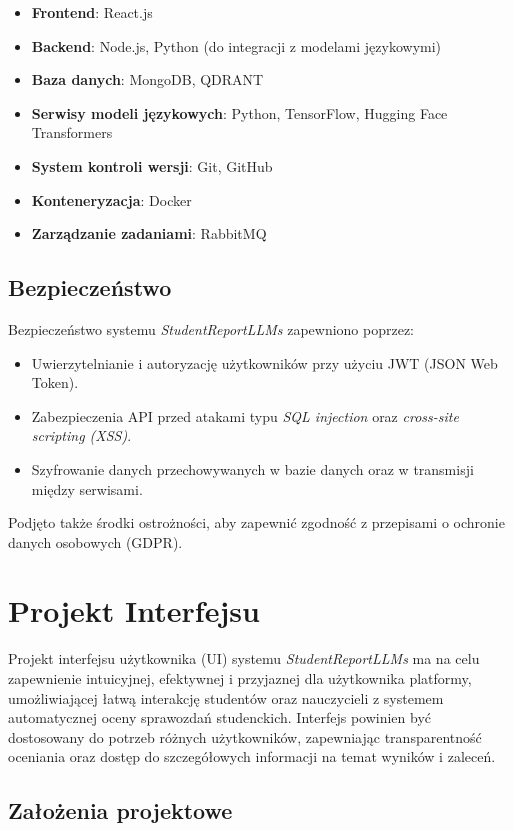 \documentclass[a4paper, 12pt]{article}
\begin{document}
\begin{itemize}
    \item \textbf{Frontend}: React.js
    \item \textbf{Backend}: Node.js, Python (do integracji z modelami językowymi)
    \item \textbf{Baza danych}: MongoDB, QDRANT
    \item \textbf{Serwisy modeli językowych}: Python, TensorFlow, Hugging Face Transformers
    \item \textbf{System kontroli wersji}: Git, GitHub
    \item \textbf{Konteneryzacja}: Docker
    \item \textbf{Zarządzanie zadaniami}: RabbitMQ
\end{itemize}

\subsection{Bezpieczeństwo}

Bezpieczeństwo systemu \textit{StudentReportLLMs} zapewniono poprzez:

\begin{itemize}
    \item Uwierzytelnianie i autoryzację użytkowników przy użyciu JWT (JSON Web Token).
    \item Zabezpieczenia API przed atakami typu \textit{SQL injection} oraz \textit{cross-site scripting (XSS)}.
    \item Szyfrowanie danych przechowywanych w bazie danych oraz w transmisji między serwisami.
\end{itemize}

Podjęto także środki ostrożności, aby zapewnić zgodność z przepisami o ochronie danych osobowych (GDPR).

\newpage
\section{Projekt Interfejsu}
Projekt interfejsu użytkownika (UI) systemu \textit{StudentReportLLMs} ma na celu zapewnienie intuicyjnej, efektywnej i przyjaznej dla użytkownika platformy, umożliwiającej łatwą interakcję studentów oraz nauczycieli z systemem automatycznej oceny sprawozdań studenckich. Interfejs powinien być dostosowany do potrzeb różnych użytkowników, zapewniając transparentność oceniania oraz dostęp do szczegółowych informacji na temat wyników i zaleceń.

\subsection{Założenia projektowe}
\end{document}

